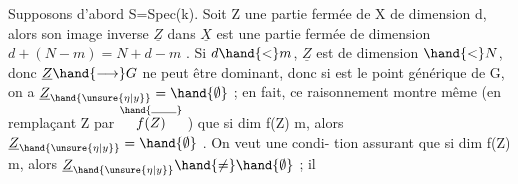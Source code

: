Supposons d'abord S=Spec(k). Soit Z une partie fermée de X de
dimension d, alors son image inverse $\underline{Z}$ dans $\underline{X}$ est une partie fermée de
dimension $d + (N-m) = N + d-m$ . Si $d \hand{<} m$, $\underline{Z}$ est de dimension $\hand{<} N$,
donc $\underline{Z} \hand{\longrightarrow} G$ ne peut être dominant, donc si  est le point générique de
G, on a $\underline{Z}_{\hand{\unsure{\eta|y}}} = \hand{\emptyset}$ ; en fait, ce raisonnement montre même (en remplaçant
Z par $\overset{\hand{\rule{1.8em}{0.35pt}}}{f(Z)}$ ) que si dim f(Z) \hand{$<$} m, alors $\underline{Z}_{\hand{\unsure{\eta|y}}} = \hand{\emptyset}$ . On veut une condi-%
tion  assurant que si dim f(Z)  m, alors $\underline{Z}_{\hand{\unsure{\eta|y}}} \hand{\neq} \hand{\emptyset}$ ;  il

